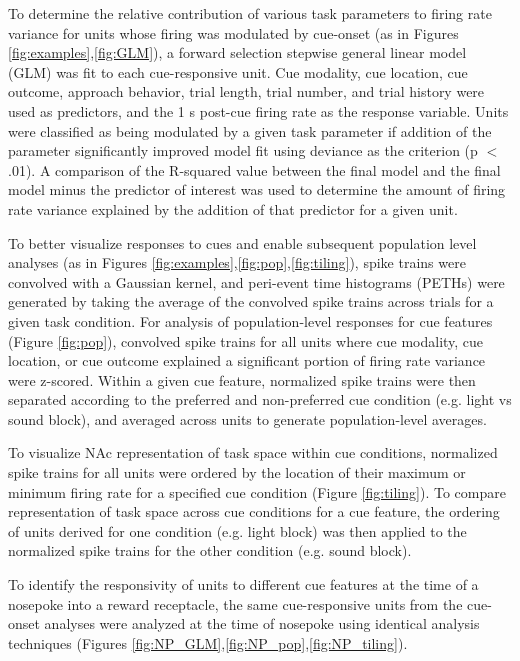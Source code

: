 \documentclass[11pt]{article}
\begin{document}
To determine the relative contribution of various task parameters to firing rate variance for units whose firing was modulated by cue-onset (as in Figures \ref{fig:examples},\ref{fig:GLM}), a forward selection stepwise general linear model (GLM) was fit to each cue-responsive unit. Cue modality, cue location, cue outcome, approach behavior, trial length, trial number, and trial history were used as predictors, and the 1 s post-cue firing rate as the response variable. Units were classified as being modulated by a given task parameter if addition of the parameter significantly improved model fit using deviance as the criterion (p $<$ .01). A comparison of the R-squared value between the final model and the final model minus the predictor of interest was used to determine the amount of firing rate variance explained by the addition of that predictor for a given unit. 

To better visualize responses to cues and enable subsequent population level analyses (as in Figures \ref{fig:examples},\ref{fig:pop},\ref{fig:tiling}), spike trains were convolved with a Gaussian kernel, and peri-event time histograms (PETHs) were generated by taking the average of the convolved spike trains across trials for a given task condition. For analysis of population-level responses for cue features (Figure \ref{fig:pop}), convolved spike trains for all units where cue modality, cue location, or cue outcome explained a significant portion of firing rate variance were z-scored. Within a given cue feature, normalized spike trains were then separated according to the preferred and non-preferred cue condition (e.g. light vs sound block), and averaged across units to generate population-level averages.

To visualize NAc representation of task space within cue conditions, normalized spike trains for all units were ordered by the location of their maximum or minimum firing rate for a specified cue condition (Figure \ref{fig:tiling}). To compare representation of task space across cue conditions for a cue feature, the ordering of units derived for one condition (e.g. light block) was then applied to the normalized spike trains for the other condition (e.g. sound block). 

To identify the responsivity of units to different cue features at the time of a nosepoke into a reward receptacle, the same cue-responsive units from the cue-onset analyses were analyzed at the time of nosepoke using identical analysis techniques (Figures \ref{fig:NP_GLM},\ref{fig:NP_pop},\ref{fig:NP_tiling}).
\end{document}
